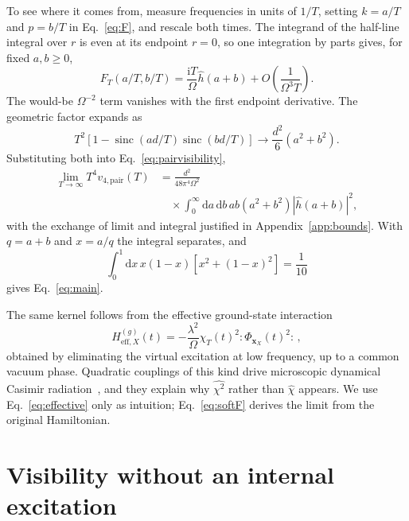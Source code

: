 \documentclass[11pt,a4paper]{article}
\newcommand{\dd}{\mathrm{d}}
\newcommand{\ii}{\mathrm{i}}
\newcommand{\sinc}{\operatorname{sinc}}
\begin{document}
To see where it comes from, measure frequencies in units of $1/T$, setting $k=a/T$ and $p=b/T$ in Eq.~\eqref{eq:F}, and rescale both times. The integrand of the half-line integral over $r$ is even at its endpoint $r=0$, so one integration by parts gives, for fixed $a,b\ge0$,
\begin{equation}
 F_T(a/T,b/T)=\frac{\ii T}{\Omega}\widehat h(a+b)
       +O\!\left(\frac{1}{\Omega^3T}\right).\label{eq:softF}
\end{equation}
The would-be $\Omega^{-2}$ term vanishes with the first endpoint derivative. The geometric factor expands as
\begin{equation}
 T^2[1-\sinc(ad/T)\sinc(bd/T)]
 \longrightarrow\frac{d^2}{6}(a^2+b^2).\label{eq:softgeometry}
\end{equation}
Substituting both into Eq.~\eqref{eq:pairvisibility},
\begin{align}
 \lim_{T\to\infty}T^4v_{4,\mathrm{pair}}(T)
 &=\frac{d^2}{48\pi^4\Omega^2}\nonumber\\
 &\quad\times\int_0^{\infty}\dd a\,\dd b\,ab(a^2+b^2)|\widehat h(a+b)|^2,
 \label{eq:limitintegral}
\end{align}
with the exchange of limit and integral justified in Appendix~\ref{app:bounds}. With $q=a+b$ and $x=a/q$ the integral separates, and
\begin{equation}
 \int_0^1\dd x\,x(1-x)[x^2+(1-x)^2]=\frac{1}{10}
\end{equation}
gives Eq.~\eqref{eq:main}.

The same kernel follows from the effective ground-state interaction
\begin{equation}
 H^{(g)}_{\mathrm{eff},X}(t)
 =-\frac{\lambda^2}{\Omega}\chi_T(t)^2:\!\Phi_{\bm x_X}(t)^2\!:\,,
 \label{eq:effective}
\end{equation}
obtained by eliminating the virtual excitation at low frequency, up to a common vacuum phase. Quadratic couplings of this kind drive microscopic dynamical Casimir radiation~\cite{Souza2018,LoLaw2018,Farias2019}, and they explain why $\widehat{\chi^2}$ rather than $\widehat\chi$ appears. We use Eq.~\eqref{eq:effective} only as intuition; Eq.~\eqref{eq:softF} derives the limit from the original Hamiltonian.

\section{Visibility without an internal excitation}
\label{sec:joint}
\end{document}
